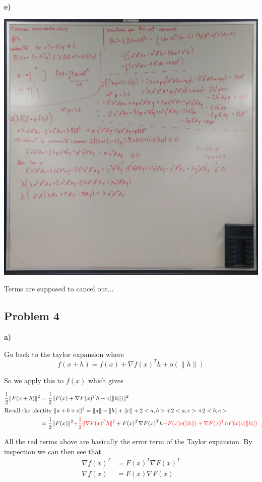 \textbf{e)}

\answer
\begin{center}
\includegraphics[width=0.75\linewidth]{fig/unconstrained_exercices/pb3_e.png}
\end{center}

Terms are supposed to cancel out... 

\incomplete

\subsection{Problem 4}

\textbf{a)}

\answer

Go back to the taylor expansion where
\[
	f(x+h) = f(x) + \nabla f(x)^Th + \text{o}(\| h\|)
\]

So we apply this to $f(x)$ which gives

\begin{align*}
	\frac{1}{2} \| F(x+h) \|^2 &= \frac{1}{2} \| F(x) + \nabla F(x)^Th + \text{o}(\| h\|) \|^2 \\
\intertext{Recall the identity $\| a + b + c\|^2 = \|a\| + \|b\| + \|c\| + 2<a,b> + 2<a,c> + 2<b,c>$}
	&= \frac{1}{2} \|  F(x)\|^2 \textcolor{red}{+ \frac{1}{2} \|  \nabla F(x)^Th\|^2}
		+ F(x)^T \nabla F(x)^Th \textcolor{red}{+ F(x)o(\|h\|) + \nabla F(x)^ThF(x)o(\|h\|)}
\end{align*}

All the red terms above are basically the error term of the Taylor expansion. By inspection we can then see that 
\begin{align*}
	\nabla f(x)^T &= F(x)^T\nabla F(x)^T \\
	\nabla f(x) &= F(x) \nabla F(x)
\end{align*}


